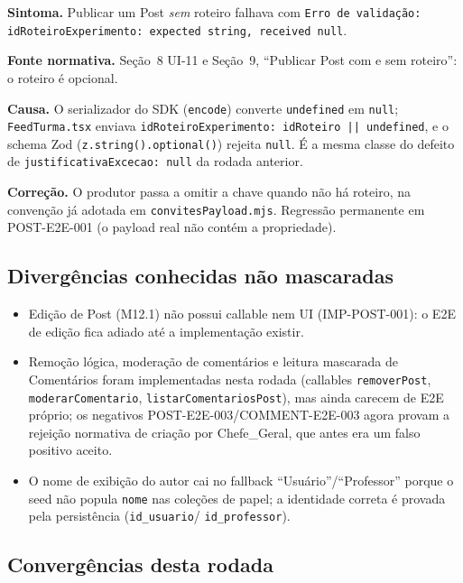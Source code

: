 \textbf{Sintoma.} Publicar um Post \emph{sem} roteiro falhava com
\texttt{Erro de validação: idRoteiroExperimento: expected string, received
null}.

\textbf{Fonte normativa.} Seção~8 UI-11 e Seção~9, ``Publicar Post com e sem
roteiro'': o roteiro é opcional.

\textbf{Causa.} O serializador do SDK (\texttt{encode}) converte
\texttt{undefined} em \texttt{null}; \texttt{FeedTurma.tsx} enviava
\texttt{idRoteiroExperimento: idRoteiro || undefined}, e o schema Zod
(\texttt{z.string().optional()}) rejeita \texttt{null}. É a mesma classe do
defeito de \texttt{justificativaExcecao: null} da rodada anterior.

\textbf{Correção.} O produtor passa a omitir a chave quando não há roteiro, na
convenção já adotada em \texttt{convitesPayload.mjs}. Regressão permanente em
POST-E2E-001 (o payload real não contém a propriedade).

\subsection{Divergências conhecidas não mascaradas}

\begin{itemize}
  \item Edição de Post (M12.1) não possui callable nem UI (IMP-POST-001): o
    E2E de edição fica adiado até a implementação existir.
  \item Remoção lógica, moderação de comentários e leitura mascarada de
    Comentários foram implementadas nesta rodada (callables \texttt{removerPost},
    \texttt{moderarComentario}, \texttt{listarComentariosPost}), mas ainda carecem
    de E2E próprio; os negativos POST-E2E-003/COMMENT-E2E-003 agora provam a
    rejeição normativa de criação por Chefe\_Geral, que antes era um falso
    positivo aceito.
  \item O nome de exibição do autor cai no fallback ``Usuário''/``Professor''
    porque o seed não popula \texttt{nome} nas coleções de papel; a identidade
    correta é provada pela persistência (\texttt{id\_usuario}/
    \texttt{id\_professor}).
\end{itemize}

\subsection{Convergências desta rodada}

